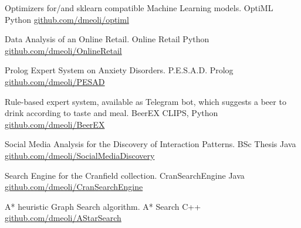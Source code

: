 

\begin{cventries}

  \cventry
    {Optimizers for/and sklearn compatible Machine Learning models.} %
    {OptiML} %
    {Python} %
    {\href{https://github.com/dmeoli/optiml}{github.com/dmeoli/optiml}} %
    {}
    
  \cventry
    {Data Analysis of an Online Retail.} %
    {Online Retail} %
    {Python} %
    {\href{https://github.com/dmeoli/OnlineRetail}{github.com/dmeoli/OnlineRetail}} %
    {}

  \cventry
    {Prolog Expert System on Anxiety Disorders.} %
    {P.E.S.A.D.} %
    {Prolog} %
    {\href{https://github.com/dmeoli/PESAD}{github.com/dmeoli/PESAD}} %
    {}

  \cventry
    {Rule-based expert system, available as Telegram bot, which suggests a beer to drink according to taste and meal.} %
    {BeerEX} %
    {CLIPS, Python} %
    {\href{https://github.com/dmeoli/BeerEX}{github.com/dmeoli/BeerEX}} %
    {}

  \cventry
    {Social Media Analysis for the Discovery of Interaction Patterns.} %
    {BSc Thesis} %
    {Java} %
    {\href{https://github.com/dmeoli/SocialMediaDiscovery}{github.com/dmeoli/SocialMediaDiscovery}} %
    {}

  \cventry
    {Search Engine for the Cranfield collection.} %
    {CranSearchEngine} %
    {Java} %
    {\href{https://github.com/dmeoli/CranSearchEngine}{github.com/dmeoli/CranSearchEngine}} %
    {}

  \cventry
    {A* heuristic Graph Search algorithm.} %
    {A* Search} %
    {C++} %
    {\href{https://github.com/dmeoli/AStarSearch}{github.com/dmeoli/AStarSearch}} %
    {}


\end{cventries}

